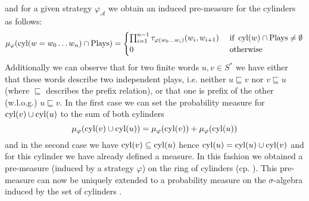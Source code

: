 and for a given strategy $\varphi_{\mathcal{A}}$ we obtain an induced
pre-measure for the cylinders as follows:
\begin{equation}
  \mu_{\varphi}(\operatorname{cyl}(w = w_{0}\dots w_{n})\cap\operatorname{Plays}) = \begin{cases}
    \prod_{i=1}^{n-1}\tau_{\varphi(w_{0}\dots w_{i})}(w_{i}, w_{i+1})
      &\text{ if }\operatorname{cyl}(w)\cap\operatorname{Plays}\neq\emptyset\\
    0 &\text{ otherwise}
  \end{cases}
\end{equation}
Additionally we can observe that for two finite words $u,v\in S^{*}$ we have
either that these words describe two independent plays, i.e. neither
$u\sqsubseteq v$ nor $v\sqsubseteq u$ (where $\sqsubseteq$ describes the prefix
relation), or that one is prefix of the other (w.l.o.g.) $u\sqsubseteq v$. In
the first case we can set the probability measure for $\operatorname{cyl}(v)\cup\operatorname{cyl}(u)$ to
the sum of both cylinders
\begin{equation}
  \mu_{\varphi}(\operatorname{cyl}(v)\cup\operatorname{cyl}(u)) = \mu_{\varphi}(\operatorname{cyl}(v)) 
  + \mu_{\varphi}(\operatorname{cyl}(u))
\end{equation}
and in the second case we have $\operatorname{cyl}(v)\subseteq\operatorname{cyl}(u)$ hence
$\operatorname{cyl}(u) = \operatorname{cyl}(u)\cup\operatorname{cyl}(v)$ and for this cylinder we have already defined
a measure. In this fashion we obtained a pre-measure (induced by a strategy
 $\varphi$) on the ring of
cylinders (cp. \cite[Chapter 1 and Chapter 3]{Bauer}). This pre-measure can
now be uniquely extended to a probability measure on the $\sigma$-algebra
induced by the set of cylinders \cite[Theorem 5.4]{Bauer}.

